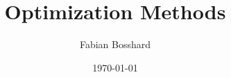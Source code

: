 \newcommand{\dif}{\mathrm{d}}

\newcommand{\R}{\mathbb{R}}
\newcommand{\N}{\mathbb{N}}
\newcommand{\Z}{\mathbb{Z}}
\newcommand{\Q}{\mathbb{Q}}
\newcommand{\C}{\mathbb{C}}

\newcommand{\Var}{\operatorname{Var}}
\newcommand{\Cov}{\operatorname{Cov}}
\newcommand{\Exp}{\operatorname{E}}
\newcommand{\Prob}{\operatorname{P}}
\newcommand{\numof}{\ensuremath{\# \,}} %
\newcommand{\blackheight}{\operatorname{bh}}

\algnewcommand{\TO}{, \ldots ,}
\algnewcommand{\DOWNTO}{, \ldots ,}
\algnewcommand{\OR}{\vee}
\algnewcommand{\AND}{\wedge}
\algnewcommand{\NOT}{\neg}
\algnewcommand{\append}{\circ}


\newcommand{\attrib}[2]{\ensuremath{#1\mathtt{.}\mathtt{#2}}} %
\newcommand{\attribnormal}[2]{\ensuremath{#1\mathtt{.}#2}} 





\title{Optimization Methods}
\author{Fabian Bosshard}
\date{\today}



\usepackage[
  colorlinks=false,        %
  pdfborder={0 0 0}        %
]{hyperref}
\usepackage[
  type     = {CC},
  modifier = {by},
  version  = {4.0},
]{doclicense}
\usepackage{cleveref}




\usepackage[acronym,              %
            nomain,               %
            toc,                  %
            nonumberlist          %
           ]{glossaries-extra}

